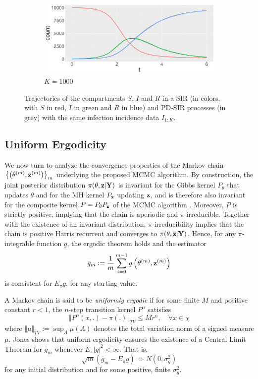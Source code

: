 \documentclass[11pt]{article}
\begin{document}
\begin{figure}
\begin{subfigure}[b]{0.49\textwidth}
			\centering
			\includegraphics[width=\textwidth]{E2_K1000}
			\caption{$K = 1000$}
			\label{fig:comparison_RD_SIR_K1000}
		\end{subfigure}
		\caption{Trajectories of the compartments $S$, $I$ and $R$ in a SIR (in colors, with $S$ in red, $I$ in green and $R$ in blue) and PD-SIR processes (in grey) with the same infection incidence data $I_{1:K}$.}
		\label{fig:comparison}
	\end{figure}
	\smallskip
	
	\subsection{Uniform Ergodicity}
	\label{sec:uni}
	We now turn to analyze the convergence properties of the Markov chain $\left\{\left(\theta^{(m)}, \mathbf{z}^{(m)}\right)\right\}_m$ underlying the proposed MCMC algorithm. By construction, the joint posterior distribution $\pi(\theta, \mathbf{z}|\mathbf{Y})$ is invariant for the Gibbs kernel $P_\theta$ that updates $\theta$ and for the MH kernel $P_{\mathbf{z}}$ updating $\mathbf{z}$, and is therefore also invariant for the composite kernel $P=P_\theta P_{\mathbf{z}}$ of the MCMC algorithm \cite{Tierney.1994}. Moreover, $P$ is strictly positive, implying that the chain is aperiodic and $\pi$-irreducible. Together with the existence of an invariant distribution, $\pi$-irreducibility implies that the chain is positive Harris recurrent and converges to $\pi(\theta, \mathbf{z}|\mathbf{Y})$. Hence, for any $\pi$-integrable function $g$, the ergodic theorem holds and the estimator
	$$\bar{g}_m := \frac{1}{m} \sum_{i=0}^{m-1} g\left(\theta^{(m)}, \mathbf{z}^{(m)}\right)$$
	is consistent for $E_\pi g$, for any starting value. 
	
	A Markov chain is said to be \textit{uniformly ergodic} if for some finite $M$ and positive constant $r<1$, the $n$-step transition kernel $P^n$ satisfies
	$$
	\Vert P^n(x,.)-\pi(.)\Vert_{TV} \le M r^n, \quad \forall x \in \chi
	$$
	where $\Vert \mu \Vert_{TV} := \sup_A \mu(A)$ denotes the total variation norm of a signed measure $\mu$.
	Jones \cite{Jones.2004b} shows that uniform ergodicity ensures the existence of a Central Limit Theorem for $\bar{g}_m$ whenever $E_\pi |g|^2 < \infty$. That is,
	$$\sqrt{m}(\bar{g}_m - E_\pi g) \Rightarrow N(0, \sigma^2_g)$$
	for any initial distribution and for some positive, finite $\sigma^2_g$. %
	
\end{document}
